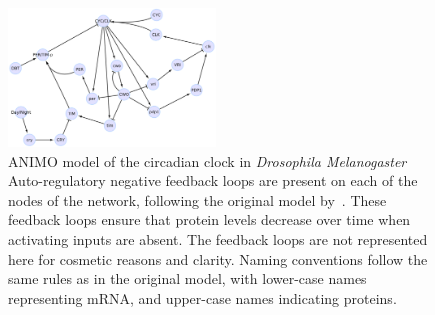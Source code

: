 \documentclass{bmcart}
\begin{document}
\begin{backmatter}
\def\drosophilaGraphScale{0.069}%
\begin{figure}[!htpb]
\begin{center}
\includegraphics[width=0.49\textwidth]{images/drosophila_model5}%
\end{center}
\caption{ANIMO model of the circadian clock in \emph{Drosophila Melanogaster} 
Auto-regulatory negative feedback loops are present on each of the nodes of
the network, following the original model by~\cite{drosophila-ode-model}. These feedback loops ensure that
protein levels decrease over time when activating inputs are absent. The feedback loops are not represented here
for cosmetic reasons and clarity.
Naming conventions follow the same rules
as in the original model, with lower-case names representing mRNA, and upper-case names indicating proteins.
}\label{fig:drosophila-model}
\end{figure}



\end{backmatter}
\end{document}
